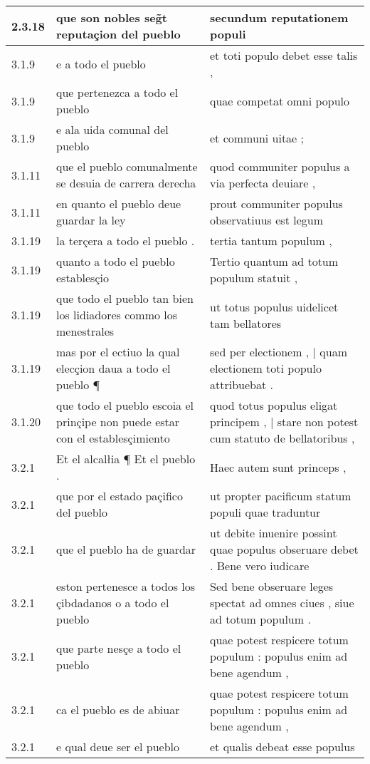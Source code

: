 \begin{tabular}{|p{1cm}|p{6.5cm}|p{6.5cm}|}
2.3.18 & que son nobles seg̃t reputaçion del pueblo & secundum reputationem populi \\\hline
3.1.9 & e a todo el pueblo & et toti populo debet esse talis , \\\hline
3.1.9 & que pertenezca a todo el pueblo & quae competat omni populo \\\hline
3.1.9 & e ala uida comunal del pueblo & et communi uitae ; \\\hline
3.1.11 & que el pueblo comunalmente se desuia de carrera derecha & quod communiter populus a via perfecta deuiare , \\\hline
3.1.11 & en quanto el pueblo deue guardar la ley & prout communiter populus observatiuus est legum \\\hline
3.1.19 & la terçera a todo el pueblo . & tertia tantum populum , \\\hline
3.1.19 & quanto a todo el pueblo establesçio & Tertio quantum ad totum populum statuit , \\\hline
3.1.19 & que todo el pueblo tan bien los lidiadores commo los menestrales & ut totus populus uidelicet tam bellatores \\\hline
3.1.19 & mas por el ectiuo la qual elecçion daua a todo el pueblo ¶ & sed per electionem , | quam electionem toti populo attribuebat . \\\hline
3.1.20 & que todo el pueblo escoia el prinçipe non puede estar con el establesçimiento & quod totus populus eligat principem , | stare non potest cum statuto de bellatoribus , \\\hline
3.2.1 & Et el alcalłia ¶ Et el pueblo . & Haec autem sunt princeps , \\\hline
3.2.1 & que por el estado paçifico del pueblo & ut propter pacificum statum populi quae traduntur \\\hline
3.2.1 & que el pueblo ha de guardar & ut debite inuenire possint quae populus obseruare debet . Bene vero iudicare \\\hline
3.2.1 & eston pertenesce a todos los çibdadanos o a todo el pueblo & Sed bene obseruare leges spectat ad omnes ciues , siue ad totum populum . \\\hline
3.2.1 & que parte nesçe a todo el pueblo & quae potest respicere totum populum : populus enim ad bene agendum , \\\hline
3.2.1 & ca el pueblo es de abiuar & quae potest respicere totum populum : populus enim ad bene agendum , \\\hline
3.2.1 & e qual deue ser el pueblo & et qualis debeat esse populus \\\hline

\end{tabular}
